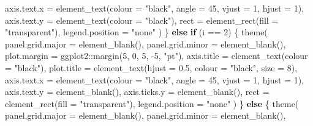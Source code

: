 \documentclass[
  11pt,
  oneside]{book}
\newenvironment{Shaded}{\begin{snugshade}}{\end{snugshade}}
\newcommand{\AttributeTok}[1]{\textcolor[rgb]{0.77,0.63,0.00}{#1}}
\newcommand{\ControlFlowTok}[1]{\textcolor[rgb]{0.13,0.29,0.53}{\textbf{#1}}}
\newcommand{\DecValTok}[1]{\textcolor[rgb]{0.00,0.00,0.81}{#1}}
\newcommand{\FloatTok}[1]{\textcolor[rgb]{0.00,0.00,0.81}{#1}}
\newcommand{\FunctionTok}[1]{\textcolor[rgb]{0.00,0.00,0.00}{#1}}
\newcommand{\NormalTok}[1]{#1}
\newcommand{\SpecialCharTok}[1]{\textcolor[rgb]{0.00,0.00,0.00}{#1}}
\newcommand{\StringTok}[1]{\textcolor[rgb]{0.31,0.60,0.02}{#1}}
\begin{document}
\begin{Shaded}
\begin{Highlighting}[]
            \AttributeTok{axis.text.x =} \FunctionTok{element\_text}\NormalTok{(}\AttributeTok{colour =} \StringTok{"black"}\NormalTok{, }\AttributeTok{angle =} \DecValTok{45}\NormalTok{, }\AttributeTok{vjust =} \DecValTok{1}\NormalTok{, }\AttributeTok{hjust =} \DecValTok{1}\NormalTok{),}
            \AttributeTok{axis.text.y =} \FunctionTok{element\_text}\NormalTok{(}\AttributeTok{colour =} \StringTok{"black"}\NormalTok{),}
            \AttributeTok{rect =} \FunctionTok{element\_rect}\NormalTok{(}\AttributeTok{fill =} \StringTok{"transparent"}\NormalTok{),}
            \AttributeTok{legend.position =} \StringTok{"none"}
\NormalTok{          )}
\NormalTok{        \} }\ControlFlowTok{else} \ControlFlowTok{if}\NormalTok{ (i }\SpecialCharTok{==} \DecValTok{2}\NormalTok{) \{}
          \FunctionTok{theme}\NormalTok{(}
            \AttributeTok{panel.grid.major =} \FunctionTok{element\_blank}\NormalTok{(),}
            \AttributeTok{panel.grid.minor =} \FunctionTok{element\_blank}\NormalTok{(),}
            \AttributeTok{plot.margin =}\NormalTok{ ggplot2}\SpecialCharTok{::}\FunctionTok{margin}\NormalTok{(}\DecValTok{5}\NormalTok{, }\DecValTok{0}\NormalTok{, }\DecValTok{5}\NormalTok{, }\SpecialCharTok{{-}}\DecValTok{5}\NormalTok{, }\StringTok{"pt"}\NormalTok{),}
            \AttributeTok{axis.title =} \FunctionTok{element\_text}\NormalTok{(}\AttributeTok{colour =} \StringTok{"black"}\NormalTok{),}
            \AttributeTok{plot.title =} \FunctionTok{element\_text}\NormalTok{(}\AttributeTok{hjust =} \FloatTok{0.5}\NormalTok{, }\AttributeTok{colour =} \StringTok{"black"}\NormalTok{, }\AttributeTok{size =} \DecValTok{8}\NormalTok{),}
            \AttributeTok{axis.text.x =} \FunctionTok{element\_text}\NormalTok{(}\AttributeTok{colour =} \StringTok{"black"}\NormalTok{, }\AttributeTok{angle =} \DecValTok{45}\NormalTok{, }\AttributeTok{vjust =} \DecValTok{1}\NormalTok{, }\AttributeTok{hjust =} \DecValTok{1}\NormalTok{),}
            \AttributeTok{axis.text.y =} \FunctionTok{element\_blank}\NormalTok{(),}
            \AttributeTok{axis.ticks.y =} \FunctionTok{element\_blank}\NormalTok{(),}
            \AttributeTok{rect =} \FunctionTok{element\_rect}\NormalTok{(}\AttributeTok{fill =} \StringTok{"transparent"}\NormalTok{),}
            \AttributeTok{legend.position =} \StringTok{"none"}
\NormalTok{          )}
\NormalTok{        \} }\ControlFlowTok{else}\NormalTok{ \{}
          \FunctionTok{theme}\NormalTok{(}
            \AttributeTok{panel.grid.major =} \FunctionTok{element\_blank}\NormalTok{(),}
            \AttributeTok{panel.grid.minor =} \FunctionTok{element\_blank}\NormalTok{(),}

\end{Highlighting}
\end{Shaded}
\end{document}
